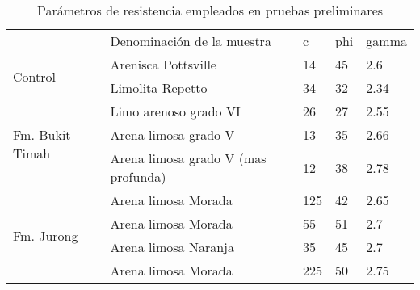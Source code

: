 \begin{table}[H]
\centering
\label{tabla_parametros}
\begin{tabular}{lllll}
                                                  & Denominaci\'on de la muestra          & c   & phi & gamma                     \\ \cline{2-5} 
\multicolumn{1}{l|}{\multirow{2}{*}{Control}}     & Arenisca Pottsville                 & 14  & 45  & \multicolumn{1}{l|}{2.6}  \\
\multicolumn{1}{l|}{}                             & Limolita Repetto                    & 34  & 32  & \multicolumn{1}{l|}{2.34} \\ \hline
\multicolumn{1}{l|}{\multirow{3}{*}{Fm. Bukit Timah}} & Limo arenoso grado VI               & 26  & 27  & \multicolumn{1}{l|}{2.55} \\
\multicolumn{1}{l|}{}                             & Arena limosa grado V                & 13  & 35  & \multicolumn{1}{l|}{2.66} \\
\multicolumn{1}{l|}{}                             & Arena limosa grado V (mas profunda) & 12  & 38  & \multicolumn{1}{l|}{2.78} \\ \hline
\multicolumn{1}{l|}{\multirow{4}{*}{Fm. Jurong}}      & Arena limosa Morada                 & 125 & 42  & \multicolumn{1}{l|}{2.65} \\
\multicolumn{1}{l|}{}                             & Arena limosa Morada                 & 55  & 51  & \multicolumn{1}{l|}{2.7}  \\
\multicolumn{1}{l|}{}                             & Arena limosa Naranja                & 35  & 45  & \multicolumn{1}{l|}{2.7}  \\
\multicolumn{1}{l|}{}                             & Arena limosa Morada                 & 225 & 50  & \multicolumn{1}{l|}{2.75} \\ \cline{2-5} 

\end{tabular}
\caption{Par\'ametros de resistencia empleados en pruebas preliminares}
\label{tab:testtParameter}
\end{table}


